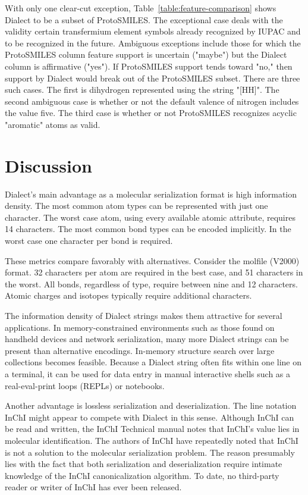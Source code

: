 \documentclass{article}
\begin{document}
With only one clear-cut exception, Table~\ref{table:feature-comparison} shows Dialect to be a subset of ProtoSMILES. The exceptional case deals with the validity certain transfermium element symbols already recognized by IUPAC and to be recognized in the future. Ambiguous exceptions include those for which the ProtoSMILES column feature support is uncertain ("maybe") but the Dialect column is affirmative ("yes"). If ProtoSMILES support tends toward "no," then support by Dialect would break out of the ProtoSMILES subset. There are three such cases. The first is dihydrogen represented using the string "[HH]". The second ambiguous case is whether or not the default valence of nitrogen includes the value five. The third case is whether or not ProtoSMILES recognizes acyclic "aromatic" atoms as valid.

\section*{Discussion}

Dialect's main advantage as a molecular serialization format is high information density. The most common atom types can be represented with just one character. The worst case atom, using every available atomic attribute, requires 14 characters. The most common bond types can be encoded implicitly. In the worst case one character per bond is required.

These metrics compare favorably with alternatives. Consider the molfile (V2000) format. 32 characters per atom are required in the best case, and 51 characters in the worst. All bonds, regardless of type, require between nine and 12 characters. Atomic charges and isotopes typically require additional characters.

The information density of Dialect strings makes them attractive for several applications. In memory-constrained environments such as those found on handheld devices and network serialization, many more Dialect strings can be present than alternative encodings. In-memory structure search over large collections becomes feasible. Because a Dialect string often fits within one line on a terminal, it can be used for data entry in manual interactive shells such as a real-eval-print loops (REPLs) or notebooks.

Another advantage is lossless serialization and deserialization. The line notation InChI might appear to compete with Dialect in this sense. Although InChI can be read and written, the InChI Technical manual notes that InChI's value lies in molecular identification. The authors of InChI have repeatedly noted that InChI is not a solution to the molecular serialization problem. The reason presumably lies with the fact that both serialization and deserialization require intimate knowledge of the InChI canonicalization algorithm. To date, no third-party reader or writer of InChI has ever been released.
\end{document}
